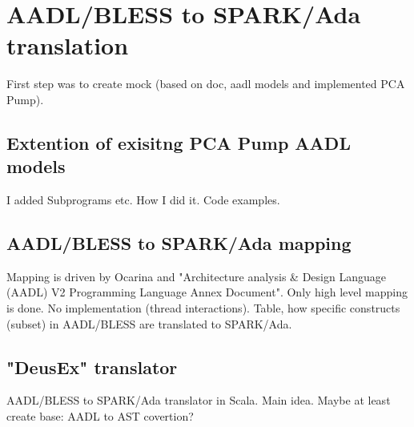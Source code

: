 
\cleardoublepage


\chapter{AADL/BLESS to SPARK/Ada translation}
\label{codegen}

First step was to create mock (based on doc, aadl models and implemented PCA Pump).


\section{Extention of exisitng PCA Pump AADL models}
\label{codegen:existing-models}
I added Subprograms etc.
How I did it. Code examples.

\section{AADL/BLESS to SPARK/Ada mapping}
\label{codegen:mapping}
Mapping is driven by Ocarina and "Architecture analysis \& Design Language (AADL) V2 Programming Language Annex Document".
Only high level mapping is done. No implementation (thread interactions). 
Table, how specific constructs (subset) in AADL/BLESS are translated to SPARK/Ada.

\section{"DeusEx" translator}
\label{codegen:translator}
AADL/BLESS to SPARK/Ada translator in Scala. Main idea.
Maybe at least create base: AADL to AST covertion?

